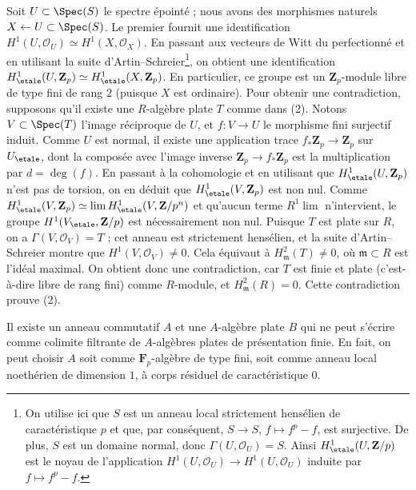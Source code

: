 \medskip\noindent
Soit $U \subset \Spec(S)$ le spectre épointé ; nous avons des morphismes naturels $X \leftarrow U \subset \Spec(S)$. Le premier fournit une
identification $H^1(U, \mathcal{O}_U) \simeq H^1(X, \mathcal{O}_X)$.
En passant aux vecteurs de Witt du perfectionné et en utilisant la suite
d'Artin--Schreier\footnote{On utilise ici que $S$ est un anneau local
strictement hensélien de caractéristique $p$ et que, par conséquent,
$S \to S$, $f \mapsto f^p - f$, est surjective.
De plus, $S$ est un domaine normal, donc
$\Gamma(U, \mathcal{O}_U) = S$. Ainsi $H^1_\etale(U, \mathbf{Z}/p)$
est le noyau de l'application
$H^1(U, \mathcal{O}_U) \to H^1(U, \mathcal{O}_U)$
induite par $f \mapsto f^p - f$.}, on obtient une identification
$H^1_\etale(U, \mathbf{Z}_p) \simeq H^1_\etale(X, \mathbf{Z}_p)$.
En particulier, ce groupe est un $\mathbf{Z}_p$-module libre de type fini
de rang $2$ (puisque $X$ est ordinaire). Pour obtenir une contradiction, supposons qu'il existe une $R$-algèbre plate $T$ comme dans (2).
Notons $V \subset \Spec(T)$ l'image réciproque de $U$, et
$f : V \to U$ le morphisme fini surjectif induit. Comme $U$ est normal,
il existe une application trace $f_*\mathbf{Z}_p \to \mathbf{Z}_p$
sur $U_\etale$, dont la composée avec l'image inverse
$\mathbf{Z}_p \to f_*\mathbf{Z}_p$ est la multiplication par $d = \deg(f)$.
En passant à la cohomologie et en utilisant que
$H^1_\etale(U, \mathbf{Z}_p)$ n'est pas de torsion, on en déduit que
$H^1_\etale(V, \mathbf{Z}_p)$ est non nul. Comme
$H^1_\etale(V, \mathbf{Z}_p) \simeq \lim H^1_\etale(V, \mathbf{Z}/p^n)$
et qu'aucun terme $R^1\lim$ n'intervient, le groupe
$H^1(V_\etale,\mathbf{Z}/p)$ est nécessairement non nul.
Puisque $T$ est plate sur $R$, on a $\Gamma(V, \mathcal{O}_V) = T$ ; cet anneau est strictement hensélien,
et la suite d'Artin--Schreier montre que $H^1(V, \mathcal{O}_V) \neq 0$.
Cela équivaut à $H^2_\mathfrak m(T) \neq 0$, où
$\mathfrak m \subset R$ est l'idéal maximal. On obtient donc une contradiction,
car $T$ est finie et plate (c'est-à-dire libre de rang fini) comme
$R$-module, et $H^2_\mathfrak m(R) = 0$. Cette contradiction prouve (2).

\begin{lemma}
\label{lemma-weird-flat-map}
Il existe un anneau commutatif $A$ et une $A$-algèbre plate $B$
qui ne peut s'écrire comme colimite filtrante de $A$-algèbres plates
de présentation finie. En fait, on peut choisir $A$ soit comme
$\mathbf{F}_p$-algèbre de type fini, soit comme anneau local noethérien
de dimension $1$, à corps résiduel de caractéristique $0$.
\end{lemma}

